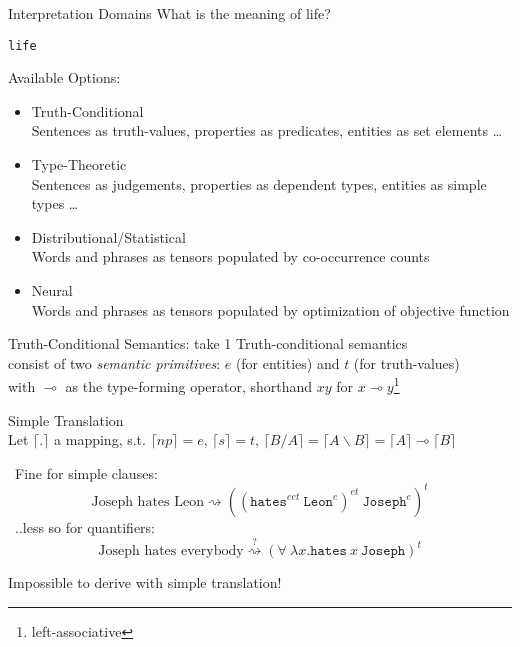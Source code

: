 \documentclass{beamer}
\newcommand{\term}[1]{\texttt{#1}}
\newcommand{\li}{\!\multimap\!}
\newcommand{\trans}[1]{\lceil #1 \rceil}
\begin{document}
\begin{frame}{Interpretation Domains}
	\small
	What is the meaning of life?
	\pause
	\begin{flushright}
		\texttt{life}
	\end{flushright}

	\pause
	Available Options:
	\begin{itemize}
		\item Truth-Conditional \\
		{\footnotesize Sentences as truth-values, properties as predicates, entities as set elements \dots}
		\item Type-Theoretic \\
		{\footnotesize Sentences as judgements, properties as dependent types, entities as simple types \dots}
		\item Distributional/Statistical \\
		{\footnotesize Words and phrases as tensors populated by co-occurrence counts}
		\item Neural \\
		{\footnotesize Words and phrases as tensors populated by optimization of objective function}
	\end{itemize}
\end{frame}

\begin{frame}{Truth-Conditional Semantics: take 1}
	\small
	\alert{Truth-conditional semantics}\\
	consist of two \textit{semantic primitives}: $e$ (for entities) and $t$ (for truth-values)\\
	with $\li$ as the type-forming operator, shorthand $xy$ for $x\li y$\footnote{left-associative}
	\vfill	
	
	\pause
	\alert{Simple Translation}\\
	Let $\trans{.}$ a mapping, s.t. $\trans{np} = e$, $\trans{s} = t$, $\trans{B/A} = \trans{A\backslash B} = \trans{A} \li \trans{B}$
	\vfill
	
	\pause
	\smiley \ Fine for simple clauses:
	\[
		\text{Joseph hates Leon} \rightsquigarrow ((\term{hates}^{eet} \ \term{Leon}^{e})^{et} \ \term{Joseph}^e)^t
	\]
	\pause
	\frownie \ ..less so for quantifiers:
	\[
		\text{Joseph hates everybody} \stackrel{?}{\rightsquigarrow} (\forall \ \lambda x.\term{hates} \ x  \ \term{Joseph})^t
	\]
	\begin{flushright}
		Impossible to derive with simple translation!
	\end{flushright}
	
\end{frame}
\end{document}
